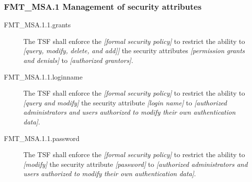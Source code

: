 \documentclass[10pt,a4paper,english]{article}
\begin{document}
\subsubsection*{FMT{\_}MSA.1 Management of security attributes}
\begin{description}
\item[FMT{\_}MSA.1.1.grants]

The TSF shall enforce the \emph{{[}formal security policy]} to restrict
the ability to \emph{{[}query, modify, delete,
and add]]} the security attributes \emph{{[}permission grants and denials]} to
\emph{{[}authorized grantors]}.

\item[FMT{\_}MSA.1.1.loginname]

The TSF shall enforce the \emph{{[}formal security policy]} to restrict
the ability to \emph{{[}query and modify]} the security
attribute \emph{{[}login name]} to \emph{{[}authorized administrators and users
authorized to modify their own authentication data]}.

\item[FMT{\_}MSA.1.1.password]

The TSF shall enforce the \emph{{[}formal security policy]} to restrict
the ability to \emph{{[}modify]} the security attribute
\emph{{[}password]} to \emph{{[}authorized administrators and users authorized to
modify their own authentication data]}.

\end{description}



\hypertarget{fmt-msa-3-static-attribute-initialisation}{}
\end{document}

